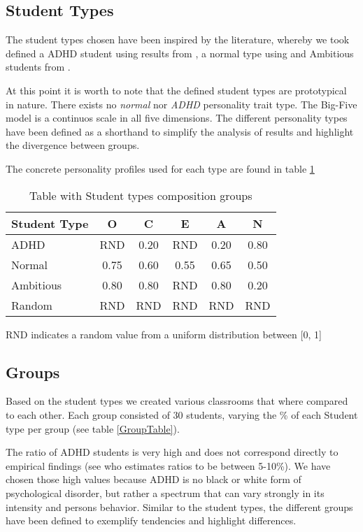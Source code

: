 \subsection{Student Types}
The student types chosen have been inspired by the literature, whereby we 
took defined a ADHD student using results from \cite{Nigg2002}, a normal type using
\cite{Srivastava2003} and Ambitious students from \cite{Asendorpf2003}.

At this point it is worth to note that the defined student types are prototypical in nature.
There exists no \textit{normal} nor \textit{ADHD} personality trait type. The Big-Five
model is a continuos scale in all five dimensions. The different personality types
have been defined as a shorthand to simplify the analysis of results and highlight
the divergence between groups.

The concrete personality profiles used for each type are found in table \ref{StudenTypesTable}

\begin{table}[h!]
    \centering
    \begin{tabular}{|l|c|c|c|c|c|} 
        \hline
        \textbf{Student Type} & \textbf{O} & \textbf{C} & \textbf{E} & \textbf{A} & \textbf{N} \\
        \hline
        \hline
        ADHD & RND & 0.20 & RND & 0.20 & 0.80 \\
        \hline
        Normal & 0.75 & 0.60 & 0.55 & 0.65 & 0.50 \\
        \hline
        Ambitious & 0.80 & 0.80 & RND & 0.80 & 0.20 \\
        \hline
        Random & RND & RND & RND & RND & RND \\
        \hline
    \end{tabular}
    \caption{Table with Student types composition groups}
    \small RND indicates a random value from a uniform distribution between [0, 1]
    \label{StudenTypesTable}
\end{table}

\subsection{Groups}
Based on the student types we created various classrooms that where compared to
each other. Each group consisted of 30 students, varying the \% of each Student
type per group (see table \ref{GroupTable}).

The ratio of ADHD students is very high and does not correspond directly to
empirical findings (see \cite{Sayal2018} who estimates ratios to be between 5-10\%).
We have chosen those high values because ADHD is no black or white form of psychological
disorder, but rather a spectrum that can vary strongly in its intensity and persons behavior.
Similar to the student types, the different groups have been defined to exemplify
tendencies and highlight differences.

